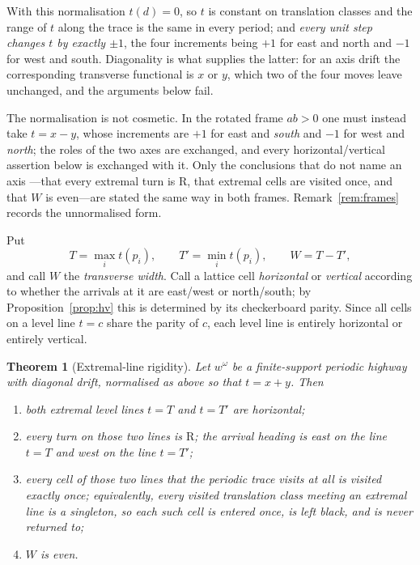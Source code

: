 \documentclass[11pt,letterpaper]{article}
\theoremstyle{plain}
\newtheorem{theorem}{Theorem}[section]
\theoremstyle{definition}
\newcommand{\drift}{d}
\newcommand{\turnR}{\mathrm{R}}
\begin{document}
\begin{NoHyper}
With this normalisation $t(\drift)=0$, so $t$ is constant on translation classes and
the range of $t$ along the trace is the same in every period; and \emph{every unit
step changes $t$ by exactly $\pm1$}, the four increments being $+1$ for east and
north and $-1$ for west and south. Diagonality is what supplies the latter: for an
axis drift the corresponding transverse functional is $x$ or $y$, which two of the
four moves leave unchanged, and the arguments below fail.

The normalisation is not cosmetic. In the rotated frame $ab>0$ one must instead take
$t=x-y$, whose increments are $+1$ for east and \emph{south} and $-1$ for west and
\emph{north}; the roles of the two axes are exchanged, and every horizontal/vertical
assertion below is exchanged with it. Only the conclusions that do not name an axis
---that every extremal turn is $\turnR$, that extremal cells are visited once, and
that $W$ is even---are stated the same way in both frames. Remark~\ref{rem:frames}
records the unnormalised form.

Put
\[
T=\max_i t(p_i),\qquad T'=\min_i t(p_i),\qquad W=T-T',
\]
and call $W$ the \emph{transverse width}. Call a lattice cell \emph{horizontal} or
\emph{vertical} according to whether the arrivals at it are east/west or north/south;
by Proposition~\ref{prop:hv} this is determined by its checkerboard parity. Since all
cells on a level line $t=c$ share the parity of $c$, each level line is entirely
horizontal or entirely vertical.

\begin{theorem}[Extremal-line rigidity]\label{thm:extremal}
Let $w^\omega$ be a finite-support periodic highway with diagonal drift, normalised
as above so that $t=x+y$. Then
\begin{enumerate}[label=\textup{(\roman*)}]
\item both extremal level lines $t=T$ and $t=T'$ are horizontal;
\item every turn on those two lines is $\turnR$; the arrival heading is east on the
line $t=T$ and west on the line $t=T'$;
\item every cell of those two lines that the periodic trace visits at all is visited
\emph{exactly once}; equivalently, every visited translation class meeting an extremal line is
a singleton, so each such cell is entered once, is left black, and is never returned
to;
\item $W$ is even.
\end{enumerate}
\end{theorem}


\end{NoHyper}
\end{document}

